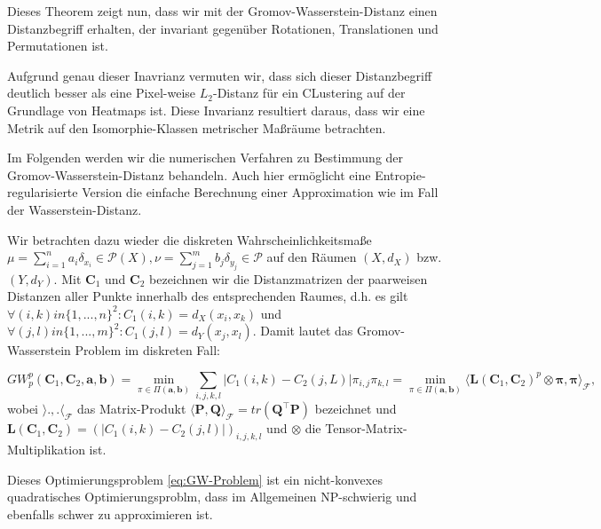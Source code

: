 \documentclass[11pt,a4paper]{article}
\numberwithin{equation}{section}
\begin{document}
	 Dieses Theorem zeigt nun, dass wir mit der Gromov-Wasserstein-Distanz einen Distanzbegriff erhalten, der invariant gegenüber Rotationen, Translationen und Permutationen ist\cite{vayer2020contribution}.
	 
	 Aufgrund genau dieser Inavrianz vermuten wir, dass sich dieser Distanzbegriff deutlich besser als eine Pixel-weise $L_2$-Distanz für ein CLustering auf der Grundlage von Heatmaps ist. Diese Invarianz resultiert daraus, dass wir eine Metrik auf den Isomorphie-Klassen metrischer Maßräume betrachten.
	 
	 Im Folgenden werden wir die numerischen Verfahren zu Bestimmung der Gromov-Wasserstein-Distanz behandeln. Auch hier ermöglicht eine Entropie-regularisierte Version die einfache Berechnung einer Approximation wie im Fall der Wasserstein-Distanz.
	 
	 Wir betrachten dazu wieder die diskreten Wahrscheinlichkeitsmaße $\mu = \sum_{i=1}^n{a_i\delta_{x_i}} \in \mathcal{P}(X), \nu = \sum_{j=1}^m{b_j\delta_{y_j}} \in \mathcal{P}$ auf den Räumen $(X,d_X)$ bzw. $(Y,d_Y)$. Mit $\boldsymbol{C}_1$ und $\boldsymbol{C}_2$ bezeichnen wir die Distanzmatrizen der paarweisen Distanzen aller Punkte innerhalb des entsprechenden Raumes, d.h. es gilt $\forall (i,k) in \lbrace 1,...,n \rbrace^2 : C_1(i,k) = d_X(x_i,x_k)$ und	$\forall (j,l) in \lbrace 1,...,m \rbrace^2 : C_1(j,l) = d_Y(x_j,x_l)$. Damit lautet das Gromov-Wasserstein Problem im diskreten Fall:
	 		
	 		\begin{equation}
	 			GW_p^p(\boldsymbol{C}_1, \boldsymbol{C}_2,\boldsymbol{a},\boldsymbol{b}) = \min_{\pi \in \Pi(\boldsymbol{a}, \boldsymbol{b})}\sum_{i,j,k,l}{|C_1(i,k)- C_2(j,L)|\pi_{i,j}\pi_{k,l}} = \min_{\pi \in \Pi(\boldsymbol{a}, \boldsymbol{b})} \langle \boldsymbol{L}(\boldsymbol{C}_1, \boldsymbol{C}_2)^p \otimes \boldsymbol{\pi}, \boldsymbol{\pi}\rangle_\mathcal{F},\label{eq:GW-Problem}
	 		\end{equation}
	 wobei $\rangle .,.\langle_\mathcal{F}$ das Matrix-Produkt $\langle \boldsymbol{P}, \boldsymbol{Q} \rangle_\mathcal{F}  = tr(\boldsymbol{Q}^\top\boldsymbol{P})$ bezeichnet und $\boldsymbol{L}(\boldsymbol{C}_1, \boldsymbol{C}_2) = (|C_1(i,k)-C_2(j,l)|)_{i,j,k,l}$ und $\otimes$ die Tensor-Matrix-Multiplikation ist.
	 
	 Dieses Optimierungsproblem \autoref{eq:GW-Problem} ist ein nicht-konvexes quadratisches Optimierungsproblm, dass im Allgemeinen NP-schwierig und ebenfalls schwer zu approximieren ist.
	 
\end{document}
